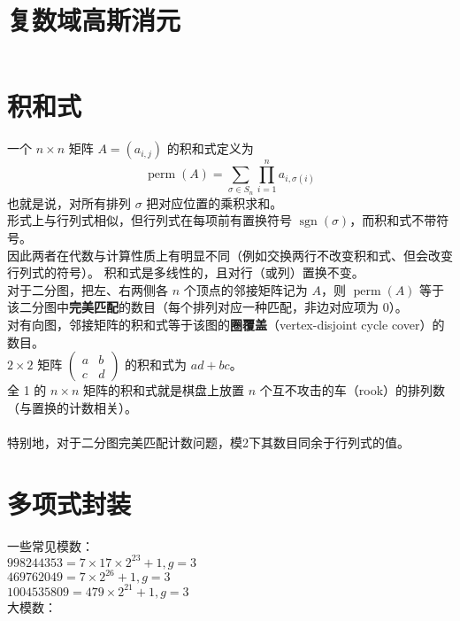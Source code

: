 \documentclass[titlepage, a4paper]{report}
\newcommand{\cppcode}[1]{  
    \inputminted[mathescape]{cpp}{source/#1}  
}
\begin{document}
\cppcode{conv.cpp}

\section{复数域高斯消元}
\cppcode{guass.cpp}

\section{积和式}
 一个 $n\times n$ 矩阵 $A=(a_{i,j})$ 的积和式定义为
$$
\operatorname{perm}(A)=\sum_{\sigma\in S_n}\prod_{i=1}^n a_{i,\sigma(i)}
$$
也就是说，对所有排列 $\sigma$ 把对应位置的乘积求和。\\
形式上与行列式相似，但行列式在每项前有置换符号 $\operatorname{sgn}(\sigma)$，而积和式不带符号。\\
因此两者在代数与计算性质上有明显不同（例如交换两行不改变积和式、但会改变行列式的符号）。
积和式是多线性的，且对行（或列）置换不变。\\
对于二分图，把左、右两侧各 $n$ 个顶点的邻接矩阵记为 $A$，则 $\operatorname{perm}(A)$
 等于该二分图中\textbf{完美匹配}的数目（每个排列对应一种匹配，非边对应项为 0）。\\
 对有向图，邻接矩阵的积和式等于该图的\textbf{圈覆盖}（vertex-disjoint cycle cover）的数目。\\
$2\times2$ 矩阵 $\begin{pmatrix}a&b\\c&d\end{pmatrix}$ 的积和式为 $ad+bc$。\\
全 1 的 $n\times n$ 矩阵的积和式就是棋盘上放置 $n$ 个互不攻击的车（rook）的排列数（与置换的计数相关）。\\
\\
特别地，对于二分图完美匹配计数问题，模2下其数目同余于行列式的值。\\


\section{多项式封装}
一些常见模数：\\

$998244353=7\times 17 \times 2^{23}+1,g=3$\\

$469762049=7\times 2^{26}+1,g=3$\\

$1004535809=479\times 2^{21}+1,g=3$
\\

大模数：\\
\end{document}
